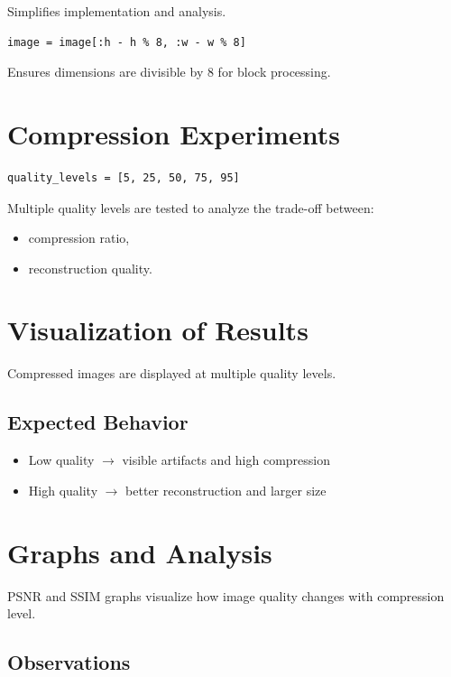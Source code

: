 \documentclass[12pt,a4paper]{article}
\begin{document}
Simplifies implementation and analysis.

\begin{lstlisting}
image = image[:h - h % 8, :w - w % 8]
\end{lstlisting}

Ensures dimensions are divisible by 8 for block processing.

\section{Compression Experiments}

\begin{lstlisting}
quality_levels = [5, 25, 50, 75, 95]
\end{lstlisting}

Multiple quality levels are tested to analyze the trade-off between:
\begin{itemize}
    \item compression ratio,
    \item reconstruction quality.
\end{itemize}

\section{Visualization of Results}

Compressed images are displayed at multiple quality levels.

\subsection{Expected Behavior}

\begin{itemize}
    \item Low quality $\rightarrow$ visible artifacts and high compression
    \item High quality $\rightarrow$ better reconstruction and larger size
\end{itemize}

\section{Graphs and Analysis}

PSNR and SSIM graphs visualize how image quality changes with compression level.

\subsection{Observations}
\end{document}
